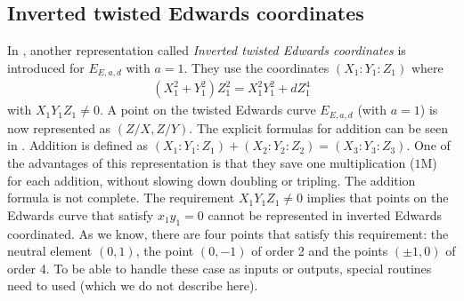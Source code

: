 \subsection{Inverted twisted Edwards coordinates}
In \cite{bernstein2007inverted}, another representation called \emph{Inverted twisted Edwards coordinates} is introduced for $E_{E,a,d}$ with  $a = 1$. They use the coordinates $(X_1 : Y_1 : Z_1)$ where
%
\begin{align*}
\left( X_1^2 + Y_1^2 \right) Z_1^2 = X_1^2 Y_1^2 + dZ_1^4
\end{align*}
%
with $X_1 Y_1 Z_1 \neq 0$.
A point on the twisted Edwards curve $E_{E,a,d}$ (with $a = 1$) is now represented as $(Z/X, Z/Y)$.
The explicit formulas for addition can be seen in .
Addition is defined as $(X_1 : Y_1 : Z_1) + (X_2 : Y_2 : Z_2) = (X_3 : Y_3 :  Z_3)$.
One of the advantages of this representation is that they save one multiplication ($1\bm{\mathrm{M}}$) for each addition, without slowing down doubling or tripling.
The addition formula is not complete. 
The requirement $X_1 Y_1 Z_1 \neq 0$ implies that points on the Edwards curve that satisfy $x_1 y_1 = 0$ cannot be represented in inverted Edwards coordinated. 
As we know, there are four points that satisfy this requirement: the neutral element $(0, 1)$, the point $(0, -1)$ of order 2 and the points $(\pm 1, 0)$ of order 4.
To be able to handle these case as inputs or outputs, special routines need to used (which we do not describe here).


